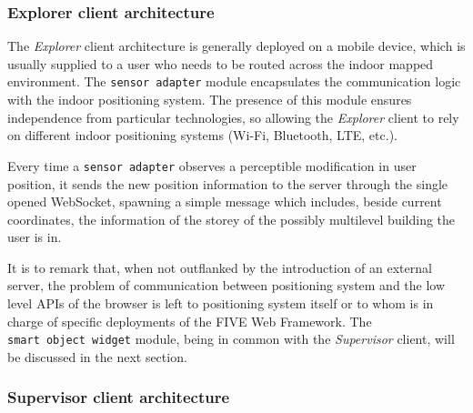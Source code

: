 \subsubsection{Explorer client architecture}\label{explorer-client-architecture}

The \emph{Explorer} client architecture is generally deployed on a mobile
device, which is usually supplied to a user who needs to be routed across the indoor mapped
environment. The \texttt{sensor\ adapter} module
encapsulates the communication logic with the indoor positioning system. The
presence of this module ensures independence from particular technologies, so
allowing the \emph{Explorer} client to rely on different indoor positioning
systems (Wi-Fi, Bluetooth, LTE, etc.).

Every time a \texttt{sensor\ adapter} observes a perceptible modification in
user position, it sends the new position information to the server through the
single opened WebSocket, spawning a simple message which includes, beside
current coordinates, the information of the storey of the possibly multilevel
building the user is in.

It is to remark that, when not outflanked by the introduction of an external
server, the problem of communication between positioning system and the low
level APIs of the browser is left to positioning system itself or to whom is
in charge of specific deployments of the FIVE Web Framework.
The \texttt{smart\ object\ widget} module, being in common with the
 \emph{Supervisor} client, will be discussed in the next section.

\subsubsection{Supervisor client architecture}\label{supervisor-client-architecture}

